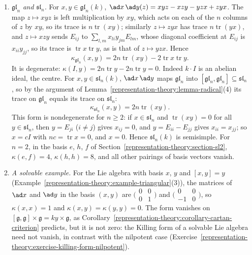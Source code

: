 \begin{example}\label{representation-theory:example-killing-forms}
\begin{enumerate}
\item \emph{$\mathfrak{gl}_n$ and $\mathfrak{sl}_n$.} For $x, y \in \mathfrak{gl}_n(k)$, $\ad x\,\ad y(z) = xyz - xzy - yzx + zyx$. The map $z \mapsto xyz$ is left multiplication by
$xy$, which acts on each of the $n$ columns of $z$ by $xy$, so its trace is $n\operatorname{tr}(xy)$; similarly $z \mapsto zyx$ has trace $n\operatorname{tr}(yx)$, and
$z \mapsto xzy$ sends $E_{ij}$ to $\sum_{l,m}x_{li}y_{jm}E_{lm}$, whose diagonal coefficient at $E_{ij}$ is $x_{ii}y_{jj}$, so its trace is
$\operatorname{tr}x\operatorname{tr}y$, as is that of $z \mapsto yzx$. Hence
\[
\kappa_{\mathfrak{gl}_n}(x, y) = 2n\operatorname{tr}(xy) - 2\operatorname{tr}x\operatorname{tr}y .
\]
It is degenerate: $\kappa(I, y) = 2n\operatorname{tr}y - 2n\operatorname{tr}y = 0$. Indeed $k \cdot I$ is an abelian ideal, the centre. For $x, y \in \mathfrak{sl}_n(k)$,
$\ad x\,\ad y$ maps $\mathfrak{gl}_n$ into $[\mathfrak{gl}_n, \mathfrak{gl}_n] \subseteq \mathfrak{sl}_n$, so by the argument of
Lemma~\ref{representation-theory:lemma-radical}(4) its trace on $\mathfrak{gl}_n$ equals its trace on $\mathfrak{sl}_n$:
\[
\kappa_{\mathfrak{sl}_n}(x, y) = 2n\operatorname{tr}(xy).
\]
This form is nondegenerate for $n \geq 2$: if $x \in \mathfrak{sl}_n$ and $\operatorname{tr}(xy) = 0$ for all $y \in \mathfrak{sl}_n$, then $y = E_{ji}$ ($i \neq j$) gives
$x_{ij} = 0$, and $y = E_{ii} - E_{jj}$ gives $x_{ii} = x_{jj}$; so $x = cI$ with $nc = \operatorname{tr}x = 0$, and $x = 0$. Hence $\mathfrak{sl}_n(k)$ is semisimple.
For $n = 2$, in the basis $e$, $h$, $f$ of Section~\ref{representation-theory:section-sl2}, $\kappa(e, f) = 4$, $\kappa(h, h) = 8$, and all other pairings of basis
vectors vanish.
\item \emph{A solvable example.} For the Lie algebra with basis $x$, $y$ and $[x, y] = y$ (Example~\ref{representation-theory:example-triangular}(3)), the matrices of
$\ad x$ and $\ad y$ in the basis $(x, y)$ are $\bigl(\begin{smallmatrix}0 & 0\\ 0 & 1\end{smallmatrix}\bigr)$ and $\bigl(\begin{smallmatrix}0 & 0\\ -1 & 0\end{smallmatrix}\bigr)$, so
$\kappa(x, x) = 1$ and $\kappa(x, y) = \kappa(y, y) = 0$. The form vanishes on $[\mathfrak{g}, \mathfrak{g}] \times \mathfrak{g} = ky \times \mathfrak{g}$, as
Corollary~\ref{representation-theory:corollary-cartan-criterion} predicts, but it is not zero: the Killing form of a solvable Lie algebra need not vanish, in contrast with the
nilpotent case (Exercise~\ref{representation-theory:exercise-killing-form-nilpotent}).
\end{enumerate}
\end{example}

